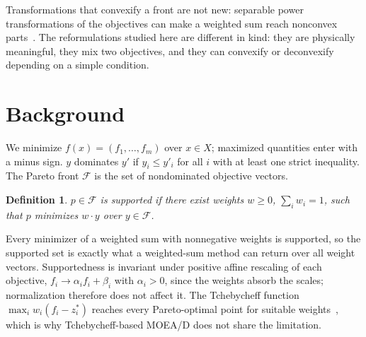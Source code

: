 \documentclass[journal]{IEEEtran}
\newtheorem{definition}{Definition}
\theoremstyle{remark}
\begin{document}
Transformations that convexify a front are not new: separable power transformations of the
objectives can make a weighted sum reach nonconvex parts~\cite{Li1996}. The reformulations studied
here are different in kind: they are physically meaningful, they mix two objectives, and they can
convexify or deconvexify depending on a simple condition.

\section{Background}
\label{sec:background}

We minimize $f(x) = (f_1,\dots,f_m)$ over $x \in X$; maximized quantities enter with a minus sign.
$y$ dominates $y'$ if $y_i \le y'_i$ for all $i$ with at least one strict inequality. The Pareto
front $\mathcal{F}$ is the set of nondominated objective vectors.

\begin{definition}
$p \in \mathcal{F}$ is \emph{supported} if there exist weights $w \ge 0$, $\sum_i w_i = 1$, such that
$p$ minimizes $w\cdot y$ over $y \in \mathcal{F}$.
\end{definition}

Every minimizer of a weighted sum with nonnegative weights is supported, so the supported set is
exactly what a weighted-sum method can return over all weight vectors. Supportedness is invariant
under positive affine rescaling of each objective, $f_i \to \alpha_i f_i + \beta_i$ with
$\alpha_i > 0$, since the weights absorb the scales; normalization therefore does not affect it. The
Tchebycheff function $\max_i w_i(f_i - z_i^*)$ reaches every Pareto-optimal point for suitable
weights~\cite{Ehrgott2005}, which is why Tchebycheff-based MOEA/D does not share the limitation.
\end{document}
